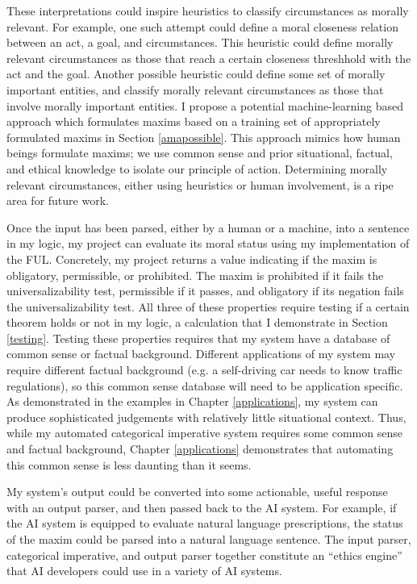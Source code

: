 \begin{isabellebody}
\begin{isamarkuptext}
These interpretations could inspire heuristics to classify circumstances as morally 
relevant. For example, one such attempt could define a moral closeness relation between an act, a 
goal, and circumstances. This heuristic could define morally relevant circumstances as those that 
reach a certain closeness threshhold with the act and the goal. Another possible heuristic could 
define some set of morally important entities, and classify morally relevant circumstances as those
that involve morally important entities. I propose a potential machine-learning based approach which formulates
maxims based on a training set of appropriately formulated maxims in Section \ref{amapossible}. This 
approach mimics how human beings formulate maxims; we use common sense and prior situational, 
factual, and ethical knowledge to isolate our principle of action. Determining morally relevant circumstances, 
either using heuristics or human involvement, is a ripe area for future work.

Once the input has been parsed, either by a human or a machine, into a sentence in my logic, my 
project can evaluate its moral status using my implementation of 
the FUL. Concretely, my project returns a value indicating if the maxim is obligatory, permissible, 
or prohibited. The maxim is prohibited if it fails the universalizability test, permissible if it passes, and obligatory 
if its negation fails the universalizability test. All three of these properties require testing if a 
certain theorem holds or not in my logic, a calculation that I demonstrate in Section \ref{testing}. 
Testing these properties requires that my system have a database of common sense or factual background. 
Different applications of my system may require different factual background (e.g. a self-driving car 
needs to know traffic regulations), so this common sense database will need to be application 
specific. As demonstrated in the examples in Chapter \ref{applications}, my system can produce sophisticated 
judgements with relatively little situational context. Thus, while my automated categorical imperative system
requires some common sense and factual background, Chapter \ref{applications} demonstrates that automating
this common sense is less daunting than it seems.

My system's output could be converted into some actionable, useful response with an output parser, 
and then passed back to the AI system. For example, if the AI system is equipped to evaluate natural 
language prescriptions, the status of the maxim could be parsed into a natural language sentence. The 
input parser, categorical imperative, and output parser together constitute an ``ethics engine'' 
that AI developers could use in a variety of AI systems.


\end{isamarkuptext}
\end{isabellebody}
